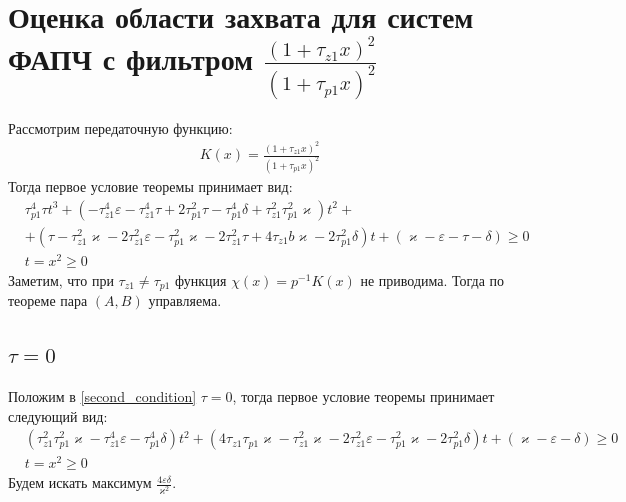 \documentclass[a4paper]{article}
\begin{document}
 

\section{Оценка области захвата для систем ФАПЧ с фильтром $\frac{(1+\tau_{z1}x)^2}{(1+\tau_{p1}x)^2}$}
 Рассмотрим передаточную функцию:
 \begin{equation}\label{filter2}
 \begin{aligned}
K(x) = \frac{(1+\tau_{z1}x)^2}{(1+\tau_{p1}x)^2}
 \end{aligned}
\end{equation}
Тогда первое условие теоремы принимает вид:
 \begin{equation}\label{second_condition}
 \begin{aligned}
&\tau_{p1}^4\tau t^3 +(- \tau_{z1}^4\varepsilon - \tau_{z1}^4\tau + 2\tau_{p1}^2\tau- \tau_{p1}^4\delta + \tau_{z1}^2\tau_{p1}^2\varkappa)t^2  +\\
&+( \tau- \tau_{z1}^2\varkappa - 2\tau_{z1}^2\varepsilon - \tau_{p1}^2\varkappa- 2\tau_{z1}^2\tau+ 4\tau_{z1}b\varkappa- 2\tau_{p1}^2\delta)t + (\varkappa-\varepsilon - \tau - \delta)  \geq 0\\
&t = x^2 \geq 0
 \end{aligned}
\end{equation}
Заметим, что при $\tau_{z1} \neq \tau_{p1}$ функция $\chi (x) = p^{-1}K(x)$ не приводима. Тогда по теореме пара $(A, B)$ управляема.
\subsection{$\tau = 0$}
Положим в \eqref{second_condition} $\tau = 0$, тогда первое условие теоремы принимает следующий вид:
 \begin{equation}
 \begin{aligned}
&(\tau_{z1}^2\tau_{p1}^2\varkappa - \tau_{z1}^4\varepsilon - \tau_{p1}^4\delta)t^2 +( 4\tau_{z1}\tau_{p1}\varkappa - \tau_{z1}^2\varkappa - 2\tau_{z1}^2\varepsilon - \tau_{p1}^2\varkappa - 2\tau_{p1}^2\delta)t + (\varkappa-\varepsilon - \delta)  \geq 0\\
&t = x^2 \geq 0
 \end{aligned}
\end{equation}
Будем искать максимум $\frac{4\varepsilon\delta}{\varkappa^2}$. 
\end{document}
